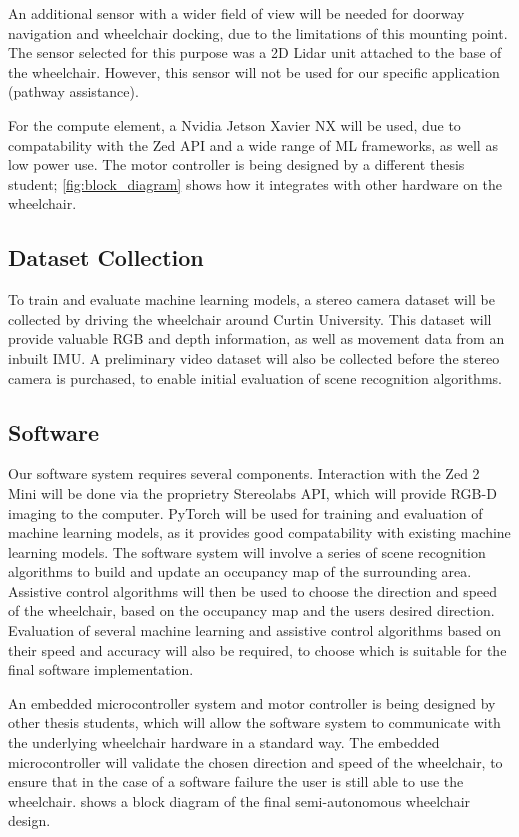 \documentclass[12pt]{article}
\begin{document}
An additional sensor with a wider field of view will be needed for doorway navigation
and wheelchair docking, due to the limitations of this mounting point. The sensor selected for this purpose
was a 2D Lidar unit attached to the base of the wheelchair. However, this sensor will not be used for
our specific application (pathway assistance).

For the compute element, a Nvidia Jetson Xavier NX will be used, due to compatability with the Zed API
and a wide range of ML frameworks, as well as low power use.
The motor controller is being designed by a different thesis student; \cref{fig:block_diagram} shows
how it integrates with other hardware on the wheelchair.

\subsection{Dataset Collection}
To train and evaluate machine learning models, a stereo camera dataset will be collected by driving the wheelchair
around Curtin University. This dataset will provide valuable RGB and depth information, as well as movement data
from an inbuilt IMU. A preliminary video dataset will also be collected before the stereo camera is purchased,
to enable initial evaluation of scene recognition algorithms.

\subsection{Software}
Our software system requires several components. Interaction with the Zed 2 Mini will be done
via the proprietry Stereolabs API, which will provide RGB-D imaging to the computer.
PyTorch \cite{paszkePyTorchImperativeStyle2019} will be used for training and evaluation of machine learning models, as it
provides good compatability with existing machine learning models.
The software system will involve a series of scene recognition algorithms to build and update an occupancy map of the surrounding area.
Assistive control algorithms will then be used to choose the direction and speed of the wheelchair, based on the occupancy map and the users desired direction.
Evaluation of several machine learning and assistive control algorithms based on their
speed and accuracy will also be required, to choose which is suitable for the final software implementation.

An embedded microcontroller system and motor controller is being designed by other thesis students,
which will allow the software system to communicate with the underlying wheelchair hardware in a standard way.
The embedded microcontroller will validate the chosen direction and speed of the wheelchair, to ensure
that in the case of a software failure the user is still able to use the wheelchair. 
shows a block diagram of the final semi-autonomous wheelchair design.
\end{document}
